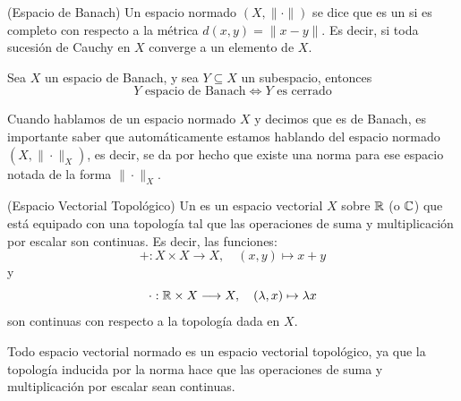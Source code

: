 \begin{definicion}(Espacio de Banach)
    Un espacio normado $(X, \|\cdot\|)$ se dice que es un  si es completo con respecto a la métrica $d(x,y) = \|x - y\|$. Es decir, si toda sucesión de Cauchy en $X$ converge a un elemento de $X$.
\end{definicion}

\begin{prop}
    Sea $X$ un espacio de Banach, y sea $Y\subseteq X$ un subespacio, entonces 
    \begin{equation*}
        Y \text{ espacio de Banach} \iff Y \text{ es cerrado}
    \end{equation*}
\end{prop}

\begin{observacion}
    Cuando hablamos de un espacio normado $X$ y decimos que es de Banach, es importante saber que automáticamente estamos hablando del espacio normado $(X,\|\cdot\|_X)$, es decir, se da por hecho que existe una norma para ese espacio notada de la forma $\|\cdot\|_X$. \\
\end{observacion}

\begin{definicion}(Espacio Vectorial Topológico)
    Un  es un espacio vectorial $X$ sobre $\mathbb{R}$ (o $\mathbb{C}$) que está equipado con una topología tal que las operaciones de suma y multiplicación por escalar son continuas. Es decir, las funciones:
    \begin{equation*}
        + : X \times X \longrightarrow X, \quad (x,y) \mapsto x + y
    \end{equation*}
    y
    \begin{equation*}
        \cdot : \mathbb{R} \times X \longrightarrow X, \quad (\lambda, x) \mapsto \lambda x
    \end{equation*}
    son continuas con respecto a la topología dada en $X$.
\end{definicion}

\begin{observacion}
    Todo espacio vectorial normado es un espacio vectorial topológico, ya que la topología inducida por la norma hace que las operaciones de suma y multiplicación por escalar sean continuas.
\end{observacion}

